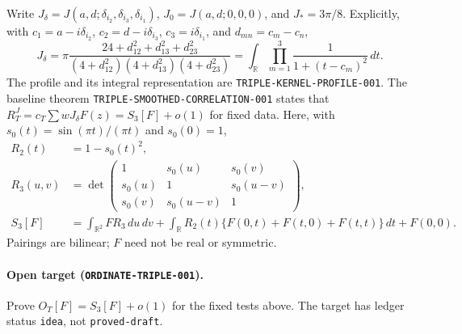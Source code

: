\documentclass[11pt]{article}
\newcommand{\R}{\mathbb R}
\newcommand{\dd}{\,d}
\begin{document}
Write $J_\delta=J(a,d;\delta_{i_2},\delta_{i_3},\delta_{i_1})$,
$J_0=J(a,d;0,0,0)$, and $J_*=3\pi/8$. Explicitly, with
$c_1=a-i\delta_{i_2}$, $c_2=d-i\delta_{i_3}$, $c_3=i\delta_{i_1}$,
and $d_{mn}=c_m-c_n$,
\begin{equation}\label{eq:profile}
 J_\delta=\pi\frac{24+d_{12}^2+d_{13}^2+d_{23}^2}
 {(4+d_{12}^2)(4+d_{13}^2)(4+d_{23}^2)}
 =\int_\R\prod_{m=1}^3\frac1{1+(t-c_m)^2}\dd t.
\end{equation}
The profile and its integral representation are
\texttt{TRIPLE-KERNEL-PROFILE-001}. The baseline theorem
\texttt{TRIPLE-SMOOTHED-CORRELATION-001} states that
$R_T^J=c_T\sum wJ_\delta F(z)=S_3[F]+o(1)$ for fixed data.
Here, with $s_0(t)=\sin(\pi t)/(\pi t)$ and $s_0(0)=1$,
\begin{align*}
 R_2(t)&=1-s_0(t)^2,\\
 R_3(u,v)&=\det\begin{pmatrix}1&s_0(u)&s_0(v)\\s_0(u)&1&s_0(u-v)\\
 s_0(v)&s_0(u-v)&1\end{pmatrix},\\
 S_3[F]&=\int_{\R^2}FR_3\dd u\dd v+
 \int_\R R_2(t)\{F(0,t)+F(t,0)+F(t,t)\}\dd t+F(0,0).
\end{align*}
Pairings are bilinear; $F$ need not be real or symmetric.
\paragraph{Open target (\texttt{ORDINATE-TRIPLE-001}).}\label{target:ordinate}
Prove $O_T[F]=S_3[F]+o(1)$ for the fixed tests above.
The target has ledger status \texttt{idea}, not \texttt{proved-draft}.
\end{document}
